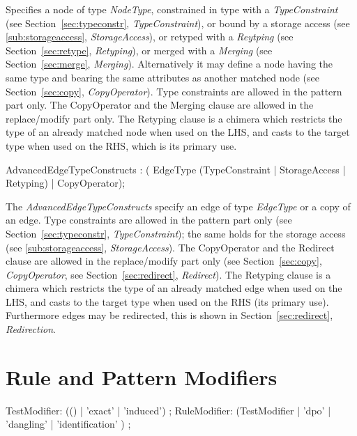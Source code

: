 Specifies a node of type \emph{NodeType},
constrained in type with a \emph{TypeConstraint} (see Section~\ref{sec:typeconstr}, \emph{TypeConstraint}),
or bound by a storage access (see \ref{sub:storageaccess}, \emph{StorageAccess}),
or retyped with a \emph{Reytping} (see Section~\ref{sec:retype}, \emph{Retyping}),
or merged with a \emph{Merging} (see Section~\ref{sec:merge}, \emph{Merging}).
Alternatively it may define a node having the same type and bearing the same attributes as another matched node (see Section~\ref{sec:copy}, \emph{CopyOperator}).
Type constraints are allowed in the pattern part only.
The CopyOperator and the Merging clause are allowed in the replace/modify part only.
The Retyping clause is a chimera which restricts the type of an already matched node when used on the LHS, and casts to the target type when used on the RHS, which is its primary use.

\begin{rail}
AdvancedEdgeTypeConstructs : ( EdgeType (TypeConstraint | StorageAccess | Retyping) | CopyOperator);
\end{rail}

The \emph{AdvancedEdgeTypeConstructs} specify an edge of type \emph{EdgeType} or a copy of an edge.
Type constraints are allowed in the pattern part only (see Section~\ref{sec:typeconstr}, \emph{TypeConstraint}); 
the same holds for the storage access (see \ref{sub:storageaccess}, \emph{StorageAccess}).
The CopyOperator and the Redirect clause are allowed in the replace/modify part only (see Section~\ref{sec:copy}, \emph{CopyOperator}, see Section~\ref{sec:redirect}, \emph{Redirect}).
The Retyping clause is a chimera which restricts the type of an already matched edge when used on the LHS, and casts to the target type when used on the RHS (its primary use).
Furthermore edges may be redirected, this is shown in Section~\ref{sec:redirect}, \emph{Redirection}.


\section{Rule and Pattern Modifiers}
\label{sct:patternmodifier}

\begin{rail}
  TestModifier: (() | 'exact' | 'induced') ;
  RuleModifier: (TestModifier | 'dpo' | 'dangling' | 'identification' ) ;
\end{rail}

